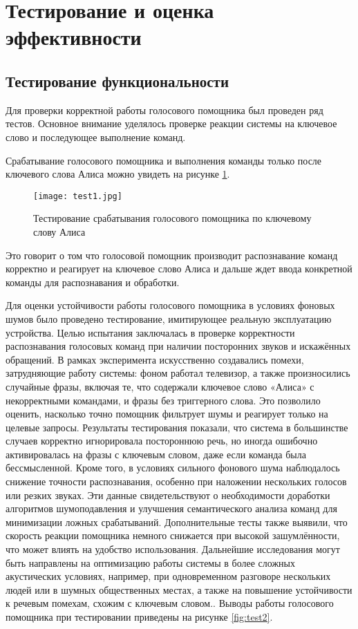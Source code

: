 \section{Тестирование и оценка эффективности}

\subsection{Тестирование функциональности}
Для проверки корректной работы голосового помощника был проведен ряд тестов. Основное внимание уделялось проверке реакции системы на ключевое слово и последующее выполнение команд. 

Срабатывание голосового помощника и выполнения команды только после ключевого слова Алиса можно увидеть на рисунке \ref{fig:test1}.

\begin{figure}[H]
	\centering
	\texttt{[image: test1.jpg]}
	\caption{Тестирование срабатывания голосового помощника по ключевому слову Алиса}
	\label{fig:test1}
\end{figure}
Это говорит о том что голосовой помощник производит распознавание команд корректно и реагирует на ключевое слово Алиса и дальше ждет ввода конкретной команды для распознавания и обработки.


Для оценки устойчивости работы голосового помощника в условиях фоновых шумов было проведено тестирование, имитирующее реальную эксплуатацию устройства. Целью испытания заключалась в проверке корректности распознавания голосовых команд при наличии посторонних звуков и искажённых обращений. В рамках эксперимента искусственно создавались помехи, затрудняющие работу системы: фоном работал телевизор, а также произносились случайные фразы, включая те, что содержали ключевое слово «Алиса» с некорректными командами, и фразы без триггерного слова. Это позволило оценить, насколько точно помощник фильтрует шумы и реагирует только на целевые запросы. Результаты тестирования показали, что система в большинстве случаев корректно игнорировала постороннюю речь, но иногда ошибочно активировалась на фразы с ключевым словом, даже если команда была бессмысленной. Кроме того, в условиях сильного фонового шума наблюдалось снижение точности распознавания, особенно при наложении нескольких голосов или резких звуках. Эти данные свидетельствуют о необходимости доработки алгоритмов шумоподавления и улучшения семантического анализа команд для минимизации ложных срабатываний. Дополнительные тесты также выявили, что скорость реакции помощника немного снижается при высокой зашумлённости, что может влиять на удобство использования. Дальнейшие исследования могут быть направлены на оптимизацию работы системы в более сложных акустических условиях, например, при одновременном разговоре нескольких людей или в шумных общественных местах, а также на повышение устойчивости к речевым помехам, схожим с ключевым словом.. Выводы работы голосового помощника при тестировании приведены на рисунке \ref{fig:test2}.

